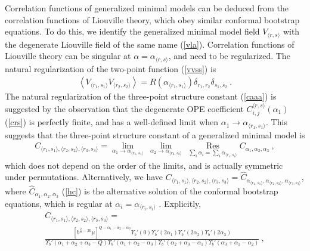\documentclass[12pt,a4paper,notitlepage]{report}
\newcommand \la {\left\langle}
\newcommand \ra {\right\rangle}
\numberwithin{equation}{section}
\theoremstyle{break}
\begin{document}
Correlation functions of generalized minimal models can be deduced from the correlation functions of Liouville theory, which obey similar conformal bootstrap equations. To do this, we identify the generalized minimal model field $V_{\langle r,s \rangle}$ with the degenerate Liouville field of the same name (\ref{vla}). 
Correlation functions of Liouville theory can be singular at $\alpha = \alpha_{\langle r,s \rangle}$, and need to be regularized. The natural regularization of the two-point function (\ref{vvss}) is
\begin{align}
 \boxed{\la V_{\langle r_1,s_1 \rangle} V_{\langle r_2,s_2 \rangle} \ra = R(\alpha_{\langle r_1,s_1 \rangle}) \delta_{r_1,r_2} \delta_{s_1,s_2}}\ .
\label{vvdd}
\end{align}
The natural regularization of the three-point structure constant (\ref{caaa}) is suggested by the observation that the degenerate OPE coefficient $C_{i,j}^{\langle r,s \rangle}(\alpha_1)$ (\ref{crs}) is perfectly finite, and has a well-defined limit when $\alpha_1\rightarrow \alpha_{\langle r_1,s_1 \rangle}$. This suggests that the three-point structure constant of a generalized minimal model is 
\begin{align}
 C_{\langle r_1,s_1\rangle ,\langle r_2,s_2\rangle ,\langle r_3,s_3 \rangle} = \underset{\alpha_1\rightarrow \alpha_{\langle r_1,s_1 \rangle}}{\lim}\ 
\underset{\alpha_2\rightarrow \alpha_{\langle r_2,s_2 \rangle}}{\lim}\ 
\underset{\sum_i \alpha_i = \sum_i \alpha_{\langle r_i,s_i \rangle} }{\operatorname{ Res}} C_{\alpha_1,\alpha_2,\alpha_3}\ ,
\end{align}
which does not depend on the order of the limits, and is actually symmetric under permutations. 
Alternatively, we have $C_{\langle r_1,s_1\rangle ,\langle r_2,s_2\rangle ,\langle r_3,s_3 \rangle} = \hat{C}_{\alpha_{\langle r_1,s_1 \rangle}, \alpha_{\langle r_2,s_2 \rangle},\alpha_{\langle r_3,s_3 \rangle}}$, where $\hat{C}_{\alpha_1,\alpha_2,\alpha_3}$ (\ref{hc}) is
the alternative solution of the conformal bootstrap equations, which is regular at $\alpha_i=\alpha_{\langle r_i,s_i \rangle}$ \cite{zam05}.
Explicitly,
\begin{multline}
C_{\langle r_1,s_1\rangle ,\langle r_2,s_2\rangle ,\langle r_3,s_3 \rangle} =  
\\
\frac{\left[b^{\frac{2}{b}-2b}\mu\right]^{Q-\alpha_1-\alpha_2-\alpha_3}\Upsilon_b'(0) \Upsilon_b'(2\alpha_1) \Upsilon_b'(2\alpha_2) \Upsilon_b'(2\alpha_3)}{\Upsilon_b'(\alpha_1+\alpha_2+\alpha_3-Q) \Upsilon_b'(\alpha_1+\alpha_2-\alpha_3)\Upsilon_b'(\alpha_2+\alpha_3-\alpha_1)\Upsilon_b'(\alpha_3+\alpha_1-\alpha_2)}\ ,
\label{crisi}
\end{multline}
\end{document}
